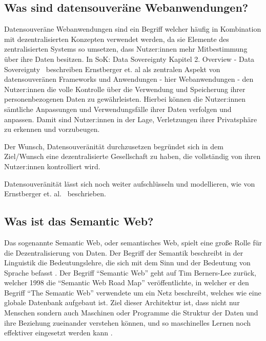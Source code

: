 \documentclass[acmtog]{acmart}
\begin{document}
\label{section:wasSindDatensouveräneWebanwendungen}
\subsection{Was sind datensouveräne Webanwendungen?}
Datensouveräne Webanwendungen sind ein Begriff welcher häufig in Kombination mit dezentralisierten Konzepten verwendet werden, da sie Elemente des zentralisierten Systems so umsetzen, dass Nutzer:innen mehr Mitbestimmung über ihre Daten besitzen.
In SoK: Data Sovereignty Kapitel 2. Overview - Data Sovereignty~\cite{cryptoeprint:2023/967} beschreiben Ernstberger et. al als zentralen Aspekt von datensouveränen Frameworks und Anwendungen - hier Webanwendungen - den Nutzer:innen die volle Kontrolle über die Verwendung und Speicherung ihrer personenbezogenen Daten zu gewährleisten. Hierbei können die Nutzer:innen sämtliche Anpassungen und Verwendungsfälle ihrer Daten verfolgen und anpassen. Damit sind Nutzer:innen in der Lage, Verletzungen ihrer Privatsphäre zu erkennen und vorzubeugen.

Der Wunsch, Datensouveränität durchzusetzen begründet sich in dem Ziel/Wunsch eine dezentralisierte Gesellschaft zu haben, die vollständig von ihren Nutzer:innen kontrolliert wird. 

Datensouveränität lässt sich noch weiter aufschlüsseln und modellieren, wie von Ernstberger et. al.~\cite{cryptoeprint:2023/967} beschrieben.


\label{section:wasIstDasSemanticWeb}
\subsection{Was ist das Semantic Web?}

Das sogenannte Semantic Web, oder semantisches Web, spielt eine große Rolle für die Dezentralisierung von Daten. Der Begriff der Semantik beschreibt in der Linguistik die Bedeutungslehre, die sich mit dem Sinn und der Bedeutung von Sprache befasst \cite{blumauer2006semantic}.
Der Begriff "`Semantic Web"' geht auf Tim Berners-Lee zurück, welcher 1998 die "`Semantic Web Road Map"' veröffentlichte, in welcher er den Begriff "`The Semantic Web"' verwendete um ein Netz beschreibt, welches wie eine globale Datenbank aufgebaut ist. Ziel dieser Architektur ist, dass nicht nur Menschen sondern auch Maschinen oder Programme die Struktur der Daten und ihre Beziehung zueinander verstehen können, und so maschinelles Lernen noch effektiver eingesetzt werden kann \cite{bernerslee1998semanticwebroadmap}.
\end{document}
